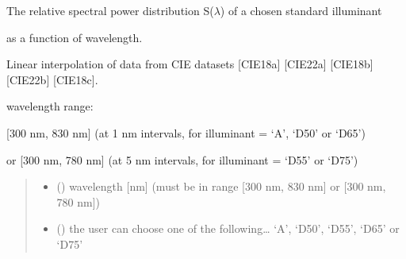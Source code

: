\documentclass[letterpaper,10pt,english]{sphinxmanual}
\begin{document}
\begin{fulllineitems}
\label{\detokenize{07_colors:skinoptics.colors.rspd}}
\pysigstartsignatures
{}
\pysigstopsignatures
\begin{DUlineblock}{0em}
\item[] The relative spectral power distribution S(\(\lambda\)) of a chosen standard illuminant
\item[] as a function of wavelength.
\item[] Linear interpolation of data from CIE datasets {[}CIE18a{]} {[}CIE22a{]} {[}CIE18b{]} {[}CIE22b{]} {[}CIE18c{]}.
\end{DUlineblock}

\begin{DUlineblock}{0em}
\item[] wavelength range:
\item[] {[}300 nm, 830 nm{]} (at 1 nm intervals, for illuminant = ‘A’, ‘D50’ or ‘D65’)
\item[] or {[}300 nm, 780 nm{]} (at 5 nm intervals, for illuminant = ‘D55’ or ‘D75’)
\end{DUlineblock}
\begin{quote}\begin{description}
\begin{itemize}
\item {} 
\sphinxAtStartPar
{} () \textendash{} wavelength {[}nm{]} (must be in range {[}300 nm, 830 nm{]} or {[}300 nm, 780 nm{]})

\item {} 
\sphinxAtStartPar
{} () \textendash{} the user can choose one of the following… ‘A’, ‘D50’, ‘D55’, ‘D65’ or ‘D75’

\end{itemize}

\end{description}\end{quote}


\end{fulllineitems}
\end{document}
